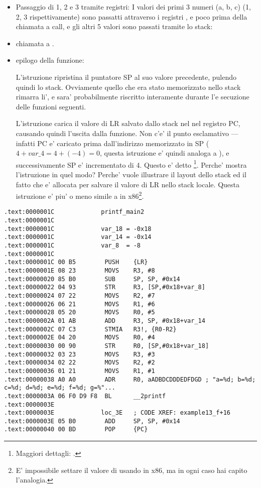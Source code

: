 \begin{itemize}
\item Passaggio di 1, 2 e 3 tramite registri:
I valori dei primi 3 numeri (a, b, c) (1, 2, 3 rispettivamente) sono passatti attraverso i registri
,  e 
poco prima della chiamata a \printf call, e gli altri 5 valori sono passati tramite lo stack:

\item chiamata a \printf.

\item epilogo della funzione:


L'istruzione  ripristina il puntatore \ac{SP} al suo valore precedente, pulendo quindi lo stack.
Ovviamente quello che era stato memorizzato nello stack rimarra li', e sara' probabilmente riscritto interamente durante l'e
secuzione delle funzioni seguenti.

L'istruzione  carica il valore di \ac{LR} salvato dallo stack nel nel registro \ac{PC}, causando quindi
l'uscita dalla funzione.
Non c'e' il punto esclamativo ---infatti \ac{PC} e' caricato prima dall'indirizzo memorizzato in \ac{SP} ($4+var\_4=4+(-4)=0$, questa istruzione e' quindi analoga a ), e successivamente \ac{SP} e' incrementato di 4.
Questo e' detto \footnote{Maggiori dettagli: .}.
Perche' \IDA mostra l'istruzione in quel modo?
Perche' vuole illustrare il layout dello stack ed il fatto che  e' allocata per salvare il valore di \ac{LR} nello stack locale.
Questa istruzione e' piu' o meno simile a  in x86\footnote{E' impossibile settare il valore di  usando \POP in x86, ma in ogni caso hai capito l'analogia.}.

\end{itemize}

\myparagraph{\OptimizingKeilVI: \ThumbMode}

\begin{lstlisting}
.text:0000001C             printf_main2
.text:0000001C
.text:0000001C             var_18 = -0x18
.text:0000001C             var_14 = -0x14
.text:0000001C             var_8  = -8
.text:0000001C
.text:0000001C 00 B5        PUSH    {LR}
.text:0000001E 08 23        MOVS    R3, #8
.text:00000020 85 B0        SUB     SP, SP, #0x14
.text:00000022 04 93        STR     R3, [SP,#0x18+var_8]
.text:00000024 07 22        MOVS    R2, #7
.text:00000026 06 21        MOVS    R1, #6
.text:00000028 05 20        MOVS    R0, #5
.text:0000002A 01 AB        ADD     R3, SP, #0x18+var_14
.text:0000002C 07 C3        STMIA   R3!, {R0-R2}
.text:0000002E 04 20        MOVS    R0, #4
.text:00000030 00 90        STR     R0, [SP,#0x18+var_18]
.text:00000032 03 23        MOVS    R3, #3
.text:00000034 02 22        MOVS    R2, #2
.text:00000036 01 21        MOVS    R1, #1
.text:00000038 A0 A0        ADR     R0, aADBDCDDDEDFDGD ; "a=%d; b=%d; c=%d; d=%d; e=%d; f=%d; g=%"...
.text:0000003A 06 F0 D9 F8  BL      __2printf
.text:0000003E
.text:0000003E             loc_3E   ; CODE XREF: example13_f+16
.text:0000003E 05 B0        ADD     SP, SP, #0x14
.text:00000040 00 BD        POP     {PC}
\end{lstlisting}

